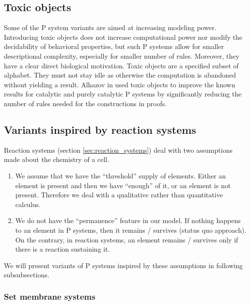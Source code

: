 
\subsection{Toxic objects} %
\label{sub:toxic_objects}

Some of the P system variants are aimed at increasing modeling power. Introducing  toxic objects \cite{Alhazov14Toxic} does not increase computational power nor modify the decidability of behavioral properties, but such P systems allow for smaller descriptional complexity, especially for smaller number of rules. Moreover, they have a clear direct biological motivation.
Toxic objects are a specified subset of alphabet. They must not stay idle as otherwise the computation is abandoned without yielding a result. 
Alhazov in \cite{Alhazov14Toxic} used toxic objects to improve the known results for catalytic and purely catalytic P systems by significantly reducing the number of rules needed for the constructions in proofs. 


\subsection{Variants inspired by reaction systems} %
\label{sub:variants_inspired_by_reaction_systems}

Reaction systems (section \ref{sec:reaction_systems}) deal with two assumptions made about the chemistry of a cell.
\begin{enumerate}
  \item We assume that we have the ``threshold'' supply of elements. Either an element is present and then we have ``enough'' of it, or an element is not present. Therefore we deal with a qualitative rather than quantitative calculus.
  \item We do not have the ``permanence'' feature in our model. If nothing happens to an element in P systems, then it remains / survives (status quo approach). On the contrary, in reaction systems, an element remains / survives only if there is a reaction sustaining it. 
\end{enumerate}

We will present variants of P systems inspired by these assumptions in following subsubsections.

\subsubsection{Set membrane systems} %
\label{ssub:set_membrane_systems}

